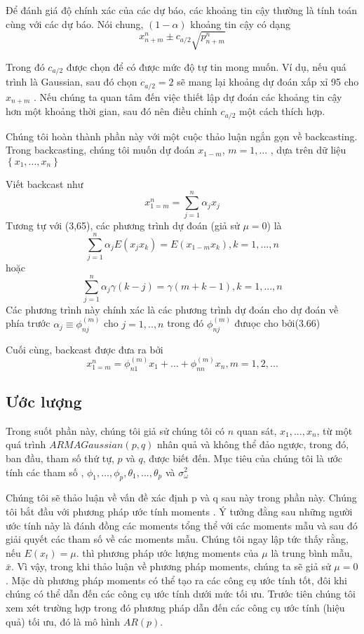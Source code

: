 \documentclass[12pt, a4paper,oneside]{book}
\theoremstyle{definition}
\begin{document}
Để đánh giá độ chính xác của các dự báo, các khoảng tin cậy thường là tính toán cùng với các dự báo. Nói chung, $ (1-\alpha) $ khoảng tin cậy có dạng 
$$ x_{n+m}^n \pm c_{a/2} \sqrt{p_{n+m}^n} $$

Trong đó $ c_{a/2} $ được chọn để có được mức độ tự tin mong muốn. Ví dụ, nếu quá trình là Gaussian, sau đó chọn $ c_{a/2} = 2 $ sẽ mang lại khoảng dự đoán xấp xỉ 95 cho $x_{n+m}$ . 
Nếu chúng ta quan tâm đến việc thiết lập dự đoán các khoảng tin cậy hơn một khoảng thời gian, sau đó nên điều chỉnh $ c_{a/2} $ một cách thích hợp.

Chúng tôi hoàn thành phần này với một cuộc thảo luận ngắn gọn về backcasting. Trong backcasting, chúng tôi muốn dự đoán $ x_{1-m} $, $ m=1,... $ , dựa trên dữ liệu $ \left\lbrace x_{1},...,x_{n} \right\rbrace $ 

Viết backcast như
$$x_{1=m}^n=\sum_{j=1}^{n}\alpha_{j}x_{j}$$
Tương tự với (3,65), các phương trình dự đoán (giả sử $ \mu = 0 $) là 
$$\sum_{j=1}^{n}\alpha_{j}E(x_{j}x_{k})=E(x_{1-m}x_{k}), k=1,...,n$$
hoặc 
$$\sum_{j=1}^{n}\alpha_{j}\gamma(k-j)=\gamma(m+k-1), k=1,...,n$$
Các phương trình này chính xác là các phương trình dự đoán cho dự đoán về phía trước $ \alpha_{j}\equiv \phi_{nj}^{(m)} $ cho $ j=1,..,n $ trong đó $ \phi_{nj}^{(m)} $ đưuọc cho bởi(3.66)

Cuối cùng, backcast được đưa ra bởi
$$ x_{1=m}^n= \phi_{n1}^{(m)}x_{1}+...+\phi_{nn}^{(m)}x_{n}, m=1,2,... $$

\subsection{Ước lượng}
	Trong suốt phần này, chúng tôi giả sử chúng tôi có $ n $ quan sát, $ x_{1} ,. . . , x_{n} $, từ một quá trình $ ARMA Gaussian (p, q) $  nhân quả và không thể đảo ngược, trong đó, ban đầu, tham số thứ tự, $ p $ và $ q $, được biết đến. Mục tiêu của chúng tôi là ước tính các tham số , $ \phi_{1} ,. . . , \phi_{p}, \theta_{1} ,. . . ,\theta_{p}  $ và $ \sigma_{\omega}^2 $ 

Chúng tôi sẽ thảo luận về vấn đề xác định p và q sau này trong phần này.
Chúng tôi bắt đầu với phương pháp ước tính moments . Ý tưởng đằng sau những người ước tính này là đánh đồng các moments tổng thể  với các moments mẫu và sau đó giải quyết các tham số về các moments mẫu. Chúng tôi ngay lập tức thấy rằng, nếu $ E(x_{t})=\mu $. thì phương pháp ước lượng moments của $ \mu $ là trung bình mẫu, $ \bar{x} $. Vì vậy, trong khi thảo luận về phương pháp moments, chúng ta sẽ giả sử $ \mu=0 $. Mặc dù phương pháp moments có thể tạo ra các công cụ ước tính tốt, đôi khi chúng có thể dẫn đến các công cụ ước tính dưới mức tối ưu. Trước tiên chúng tôi xem xét trường hợp trong đó phương pháp dẫn đến các công cụ ước tính (hiệu quả) tối ưu, đó là mô hình $ AR(p) $.
\end{document}
